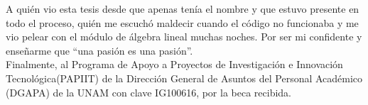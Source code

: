 \begin{acknowledgements}
A quién vio esta tesis desde que apenas tenía el nombre y que estuvo presente en todo el proceso, quién me escuchó maldecir cuando el código no funcionaba y me vio pelear con el módulo de álgebra lineal muchas noches. Por ser mi confidente y enseñarme que \textquotedblleft una pasión es una pasión\textquotedblright.\\

Finalmente, al Programa de Apoyo a Proyectos de Investigación e Innovación Tecnológica(PAPIIT) de la Dirección General de Asuntos del Personal Académico (DGAPA) de la UNAM con clave IG100616, por la beca recibida.

\end{acknowledgements}




